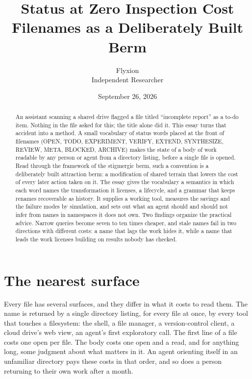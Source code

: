 \documentclass[11pt]{article}
\title{Status at Zero Inspection Cost\\[4pt]
\large Filenames as a Deliberately Built Berm}
\author{Flyxion\\Independent Researcher}
\date{September 26, 2026}
\newcommand{\st}[1]{\textsf{#1}}
\begin{document}
\maketitle

\begin{abstract}
An assistant scanning a shared drive flagged a file titled ``incomplete report'' as a to-do item. Nothing in the file asked for this; the title alone did it. This essay turns that accident into a method. A small vocabulary of status words placed at the front of filenames (\st{OPEN}, \st{TODO}, \st{EXPERIMENT}, \st{VERIFY}, \st{EXTEND}, \st{SYNTHESIZE}, \st{REVIEW}, \st{META}, \st{BLOCKED}, \st{ARCHIVE}) makes the state of a body of work readable by any person or agent from a directory listing, before a single file is opened. Read through the framework of the stigmergic berm, such a convention is a deliberately built attraction berm: a modification of shared terrain that lowers the cost of every later action taken on it. The essay gives the vocabulary a semantics in which each word names the transformation it licenses, a lifecycle, and a grammar that keeps renames recoverable as history. It supplies a working tool, measures the savings and the failure modes by simulation, and sets out what an agent should and should not infer from names in namespaces it does not own. Two findings organize the practical advice. Narrow queries become seven to ten times cheaper, and stale names fail in two directions with different costs: a name that lags the work hides it, while a name that leads the work licenses building on results nobody has checked.
\end{abstract}

\section{The nearest surface}

Every file has several surfaces, and they differ in what it costs to read them. The name is returned by a single directory listing, for every file at once, by every tool that touches a filesystem: the shell, a file manager, a version-control client, a cloud drive's web view, an agent's first exploratory call. The first line of a file costs one open per file. The body costs one open and a read, and for anything long, some judgment about what matters in it. An agent orienting itself in an unfamiliar directory pays these costs in that order, and so does a person returning to their own work after a month.
\end{document}
